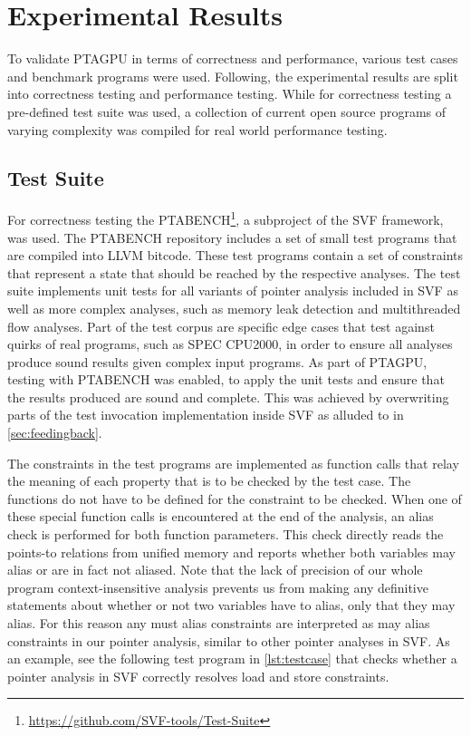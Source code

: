 \section{Experimental Results}
To validate PTAGPU in terms of correctness and performance, various test cases and benchmark programs were used.
Following, the experimental results are split into correctness testing and performance testing.
While for correctness testing a pre-defined test suite was used, a collection of current open source programs of varying complexity was compiled for real world performance testing.

\subsection{Test Suite}\label{sec:testsuite}
For correctness testing the PTABENCH\footnote{\url{https://github.com/SVF-tools/Test-Suite}}, a subproject of the SVF framework, was used.
The PTABENCH repository includes a set of small test programs that are compiled into LLVM bitcode. These test programs contain a set of constraints that represent a state that should be reached by the respective analyses.
The test suite implements unit tests for all variants of pointer analysis included in SVF as well as more complex analyses, such as memory leak detection and multithreaded flow analyses. 
Part of the test corpus are specific edge cases that test against quirks of real programs, such as SPEC CPU2000, in order to ensure all analyses produce sound results given complex input programs.
As part of PTAGPU, testing with PTABENCH was enabled, to apply the unit tests and ensure that the results produced are sound and complete.
This was achieved by overwriting parts of the test invocation implementation inside SVF as alluded to in \autoref{sec:feedingback}.

The constraints in the test programs are implemented as function calls that relay the meaning of each property that is to be checked by the test case. The functions do not have to be defined for the constraint to be checked.
When one of these special function calls is encountered at the end of the analysis, an alias check is performed for both function parameters.
This check directly reads the points-to relations from unified memory and reports whether both variables may alias or are in fact not aliased.
Note that the lack of precision of our whole program context-insensitive analysis prevents us from making any definitive statements about whether or not two variables have to alias, only that they may alias. For this reason any must alias constraints are interpreted as may alias constraints in our pointer analysis, similar to other pointer analyses in SVF.
As an example, see the following test program in \autoref{lst:testcase} that checks whether a pointer analysis in SVF correctly resolves load and store constraints.


